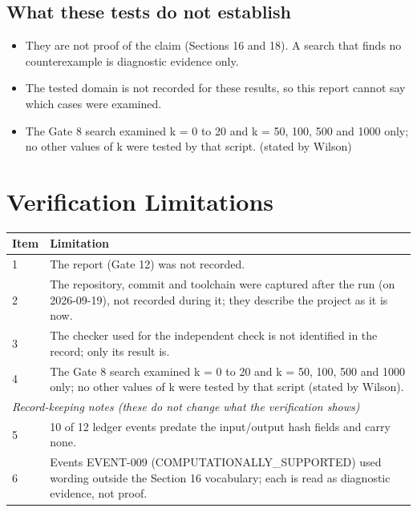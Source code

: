 \documentclass[11pt]{article}
\begin{document}
\subsection*{What these tests do not establish}
\begin{itemize}
\item They are not proof of the claim (Sections 16 and 18). A search that finds no counterexample is diagnostic evidence only.
\item The tested domain is not recorded for these results, so this report cannot say which cases were examined.
\item The Gate 8 search examined k = 0 to 20 and k = 50, 100, 500 and 1000 only; no other values of k were tested by that script. (stated by Wilson)
\end{itemize}
\section{Verification Limitations}
\begin{longtable}{p{}p{}}
\toprule Item & Limitation \\ \midrule \endhead
1 & The report (Gate 12) was not recorded. \\
2 & The repository, commit and toolchain were captured after the run (on 2026-09-19), not recorded during it; they describe the project as it is now. \\
3 & The checker used for the independent check is not identified in the record; only its result is. \\
4 & The Gate 8 search examined k = 0 to 20 and k = 50, 100, 500 and 1000 only; no other values of k were tested by that script (stated by Wilson). \\
\midrule \multicolumn{2}{l}{\textit{Record-keeping notes (these do not change what the verification shows)}} \\ \midrule
5 & 10 of 12 ledger events predate the input/output hash fields and carry none. \\
6 & Events EVENT-009 (COMPUTATIONALLY\_SUPPORTED) used wording outside the Section 16 vocabulary; each is read as diagnostic evidence, not proof. \\
\bottomrule
\end{longtable}
\end{document}
